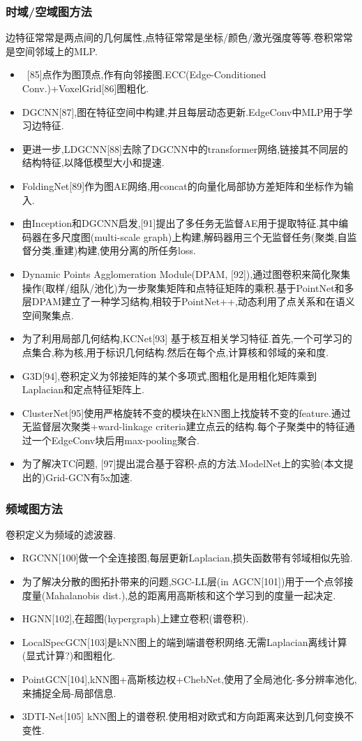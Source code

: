 \documentclass{article}
\begin{document}
\subsubsection{时域/空域图方法}
边特征常常是两点间的几何属性,点特征常常是坐标/颜色/激光强度等等.卷积常常是空间邻域上的MLP.
\begin{itemize}
    \item \ [85]点作为图顶点,作有向邻接图.ECC(Edge-Conditioned Conv.)+VoxelGrid[86]图粗化.
    \item DGCNN[87],图在特征空间中构建,并且每层动态更新.EdgeConv中MLP用于学习边特征.
    \item 更进一步,LDGCNN[88]去除了DGCNN中的transformer网络,链接其不同层的结构特征,以降低模型大小和提速.
    \item FoldingNet[89]作为图AE网络,用concat的向量化局部协方差矩阵和坐标作为输入.
    \item 由Inception和DGCNN启发,[91]提出了多任务无监督AE用于提取特征.其中编码器在多尺度图(multi-scale graph)上构建,解码器用三个无监督任务(聚类,自监督分类,重建)构建,使用分离的所任务loss.
    \item Dynamic Points Agglomeration Module(DPAM, [92]),通过图卷积来简化聚集操作(取样/组队/池化)为一步\trarr 聚集矩阵和点特征矩阵的乘积.基于PointNet和多层DPAM建立了一种学习结构,相较于PointNet++,动态利用了点关系和在语义空间聚集点.
    \item 为了利用局部几何结构,KCNet[93] 基于核互相关学习特征.首先,一个可学习的点集合,称为核,用于标识几何结构.然后在每个点,计算核和邻域的亲和度.
    \item G3D[94],卷积定义为邻接矩阵的某个多项式,图粗化是用粗化矩阵乘到Laplacian和定点特征矩阵上.
    \item ClusterNet[95]使用严格旋转不变的模块在kNN图上找旋转不变的feature.通过无监督层次聚类+ward-linkage criteria建立点云的结构.每个子聚类中的特征通过一个EdgeConv块后用max-pooling聚合.
    \item 为了解决TC问题, [97]提出混合基于容积-点的方法.ModelNet上的实验(本文提出的)Grid-GCN有5x加速.
\end{itemize}

\subsubsection{频域图方法}
卷积定义为频域的滤波器.
\begin{itemize}
    \item RGCNN[100]做一个全连接图,每层更新Laplacian,损失函数带有邻域相似先验.
    \item 为了解决分散的图拓扑带来的问题,SGC-LL层(in AGCN[101])用于一个点邻接度量(Mahalanobis dist.),总的距离用高斯核和这个学习到的度量一起决定.
    \item HGNN[102],在超图(hypergraph)上建立卷积(谱卷积).
    \item LocalSpecGCN[103]是kNN图上的端到端谱卷积网络.无需Laplacian离线计算(显式计算?)和图粗化.
    \item PointGCN[104],kNN图+高斯核边权+ChebNet,使用了全局池化-多分辨率池化,来捕捉全局-局部信息.
    \item 3DTI-Net[105] kNN图上的谱卷积.使用相对欧式和方向距离来达到几何变换不变性.
\end{itemize}
\end{document}
